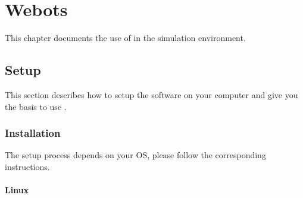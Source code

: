 
\newenvironment{attribute}[4]
{
    \begin{description}
    \item[Permissions] #2.
    \item[Type] #3.
      \ifx#4\empty\else
    \item[Range] #4.
      \fi
    \item[Description]
}{
    \end{description}
}

\chapter{Webots}
\label{sec:webots}

This chapter documents the use of \urbi in the \webots simulation
environment.

\section{Setup}

This section describes how to setup the software on your computer and
give you the basis to use \uwebots{}.

\subsection{Installation}

The setup process depends on your OS, please follow the corresponding
instructions.

\subsubsection{Linux}

